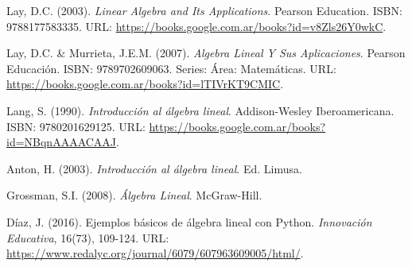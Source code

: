 
\begin{thebibliography}{9}

Lay, D.C. (2003). \emph{Linear Algebra and Its Applications}. Pearson Education. ISBN: 9788177583335. URL: \url{https://books.google.com.ar/books?id=v8Zls26Y0wkC}.

Lay, D.C. \& Murrieta, J.E.M. (2007). \emph{Algebra Lineal Y Sus Aplicaciones}. Pearson Educaci{\'o}n. ISBN: 9789702609063. Series: {\'A}rea: Matem{\'a}ticas. URL: \url{https://books.google.com.ar/books?id=lTIVrKT9CMIC}.

Lang, S. (1990). \emph{Introducci{\'o}n al {\'a}lgebra lineal}. Addison-Wesley Iberoamericana. ISBN: 9780201629125. URL: \url{https://books.google.com.ar/books?id=NBqnAAAACAAJ}.

Anton, H. (2003). \emph{Introducci{\'o}n al {\'a}lgebra lineal}. Ed. Limusa.

Grossman, S.I. (2008). \emph{{\'A}lgebra Lineal}. McGraw-Hill.

D{\'i}az, J. (2016). Ejemplos b{\'a}sicos de {\'a}lgebra lineal con Python. \emph{Innovación Educativa}, 16(73), 109-124. URL: \url{https://www.redalyc.org/journal/6079/607963609005/html/}.

\end{thebibliography}




